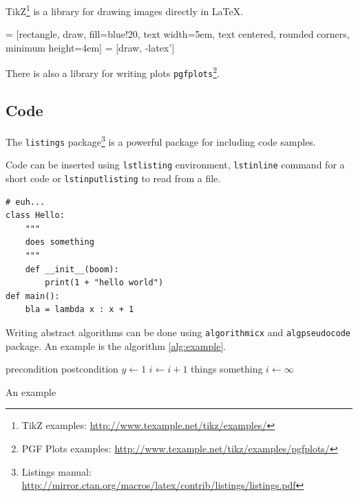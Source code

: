 TikZ\footnote{%
TikZ examples: \url{http://www.texample.net/tikz/examples/}}
is a library for drawing images directly in \LaTeX{}.
\begin{center}
 = [rectangle, draw, fill=blue!20,
	text width=5em, text centered, rounded corners, minimum height=4em]
 = [draw, -latex']
\end{center}

There is also a library for writing plots \texttt{pgfplots}\footnote{%
PGF Plots examples: \url{http://www.texample.net/tikz/examples/pgfplots/}}.
\begin{center}
\end{center}

\subsection{Code}

The \texttt{listings} package\footnote{%
Listings manual:
\url{http://mirror.ctan.org/macros/latex/contrib/listings/listings.pdf}}
is a powerful package for including code samples.

Code can be inserted using \texttt{lstlisting} environment, \texttt{lstinline}
command for a short code or \texttt{lstinputlisting} to read from a file.

\begin{lstlisting}[style=python]
# euh...
class Hello:
	"""
	does something
	"""
	def __init__(boom):
		print(1 + "hello world")
def main():
	bla = lambda x : x + 1
\end{lstlisting}

Writing abstract algorithms can be done using \texttt{algorithmicx} and
\texttt{algpseudocode} package.
An example is the algorithm \ref{alg:example}.

\begin{algorithm}[H]
\begin{algorithmic}[1]
\Require precondition
\Ensure postcondition
\State $y \leftarrow 1$
	\State $i \gets i + 1$
\EndFor
{}
	\State things
\EndWhile
\Repeat
	\State something
\Loop
	\State $i \leftarrow \infty$
\EndLoop
\end{algorithmic}
\caption{An example}
\label{alg:example}
\end{algorithm}

